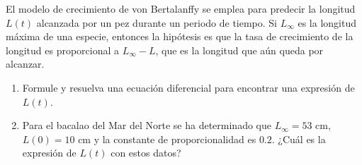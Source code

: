\item El modelo de crecimiento de von Bertalanffy se emplea para predecir la longitud $L(t)$ alcanzada por un pez durante un periodo de tiempo. Si $L_\infty$ es la longitud máxima de una especie, entonces la hipótesis es que la tasa de crecimiento de la longitud es proporcional a $L_\infty - L$, que es la longitud que aún queda por alcanzar.
    \begin{enumerate}
        \item[(a)] Formule y resuelva una ecuación diferencial para encontrar una expresión de $L(t)$.
        \item[(b)] Para el bacalao del Mar del Norte se ha determinado que $L_\infty = 53 \text{ cm}$, $L(0) = 10 \text{ cm}$ y la constante de proporcionalidad es $0.2$. ¿Cuál es la expresión de $L(t)$ con estos datos?
    \end{enumerate}
